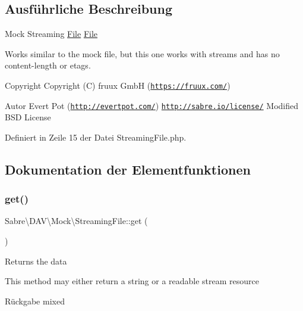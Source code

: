 \subsection{Ausführliche Beschreibung}
Mock Streaming \mbox{\hyperlink{class_sabre_1_1_d_a_v_1_1_mock_1_1_file}{File}} \mbox{\hyperlink{class_sabre_1_1_d_a_v_1_1_mock_1_1_file}{File}}

Works similar to the mock file, but this one works with streams and has no content-\/length or etags.

\begin{DoxyCopyright}{Copyright}
Copyright (C) fruux GmbH (\href{https://fruux.com/}{\tt https\+://fruux.\+com/}) 
\end{DoxyCopyright}
\begin{DoxyAuthor}{Autor}
Evert Pot (\href{http://evertpot.com/}{\tt http\+://evertpot.\+com/})  \href{http://sabre.io/license/}{\tt http\+://sabre.\+io/license/} Modified B\+SD License 
\end{DoxyAuthor}


Definiert in Zeile 15 der Datei Streaming\+File.\+php.



\subsection{Dokumentation der Elementfunktionen}
\mbox{\label{class_sabre_1_1_d_a_v_1_1_mock_1_1_streaming_file_a4492beb835030b97e2bc3e6c4d2cdf4d}} 
\subsubsection{\texorpdfstring{get()}{get()}}
{\footnotesize\ttfamily Sabre\textbackslash{}\+D\+A\+V\textbackslash{}\+Mock\textbackslash{}\+Streaming\+File\+::get (\begin{DoxyParamCaption}{ }\end{DoxyParamCaption})}

Returns the data

This method may either return a string or a readable stream resource

\begin{DoxyReturn}{Rückgabe}
mixed 
\end{DoxyReturn}


